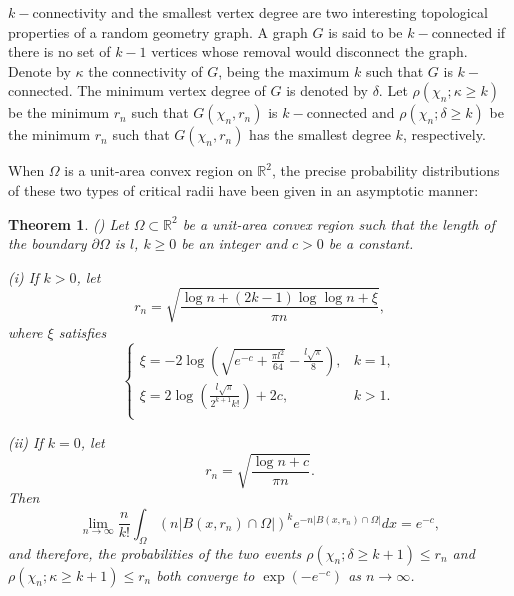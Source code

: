 \documentclass[preprint,12pt]{elsarticle}
\newtheorem{theorem}{Theorem}
\begin{document}
 $k-$connectivity and
the smallest vertex degree are two interesting topological
properties of a random geometry graph. A graph $G$ is said to be
$k-$connected if there is no set of $k-1$ vertices whose removal
would disconnect the graph. Denote by $\kappa$ the connectivity of
$G$, being the maximum $k$ such that $G$ is $k-$connected.
The minimum vertex degree of $G$ is denoted by $\delta$.   Let
$\rho(\chi_n;\kappa\geq k)$ be the minimum $r_n$ such that
$G(\chi_n,r_n)$ is $k-$connected and $\rho(\chi_n;\delta\geq k)$ be
the minimum $r_n$ such that $G(\chi_n,r_n)$ has the smallest degree $k$, respectively.

When $\Omega$ is a unit-area convex region on $\mathbb{R}^2$, the precise probability distributions of these two types of critical radii have been given in an asymptotic manner:
\begin{theorem}\label{thm:combined-Main}(\cite{Ding-RGG2018, Ding-RGG2025})
Let $\Omega\subset \mathbb{R}^2$ be a unit-area convex region such that the length of
the boundary $\partial\Omega$  is $l$, $k\geq 0$ be an integer and $c>0$ be a constant.
\par (i) If $k>0$, let
     \begin{equation*}\label{eq:Theorem-formula-1}
        r_n=\sqrt{\frac{\log n+(2k-1)\log\log n+\xi}{\pi n }},
     \end{equation*}
where $\xi$ satisfies
$$ \left\{\begin{array}{cc}
     \xi=-2\log \left(\sqrt{e^{-c}+\frac{\pi l^2}{64}}-\frac{l\sqrt{\pi}}{8}\right), & k=1, \\
      \xi=2\log \left(\frac{l\sqrt{\pi}}{2^{k+1}k!}\right)+2c, & k>1. \\
    \end{array}
        \right.
$$
\par (ii) If $k=0$, let
     \begin{equation*}\label{eq:Theorem-formula-2}
        r_n=\sqrt{\frac{\log n+c}{\pi n }}.
     \end{equation*}
Then
    \begin{equation}\label{eq:Theorem-formula-3}
       \lim_{n\rightarrow\infty} \frac n{k!}\int_{\Omega}\left(n|B(x,r_n)\cap\Omega|\right)^k e^{-n|B(x,r_n)\cap\Omega|}dx= e^{-c},
    \end{equation}
and therefore,  the probabilities of the two events
$\rho(\chi_n;\delta\geq k+1)\leq r_n$ and $\rho(\chi_n;\kappa\geq
k+1)\leq r_n$ both converge to $\exp\left(-e^{-c}\right)$  as $n\rightarrow\infty$.
\end{theorem}
\end{document}
